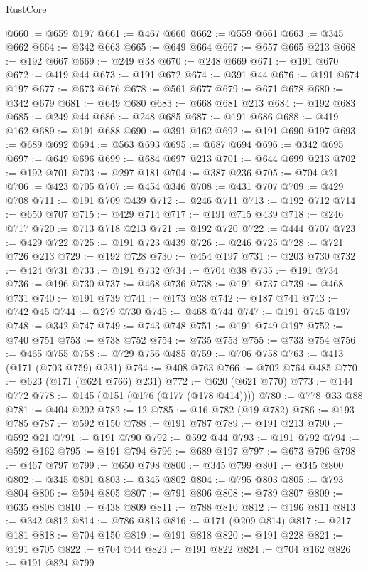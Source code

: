 \begin{lexlean}{RustCore}
\begin{coremodule}
@660 := @659 @197
@661 := @467 @660
@662 := @559 @661
@663 := @345 @662
@664 := @342 @663
@665 := @649 @664
@667 := @657 @665 @213
@668 := @192 @667
@669 := @249 @38
@670 := @248 @669
@671 := @191 @670
@672 := @419 @44
@673 := @191 @672
@674 := @391 @44
@676 := @191 @674 @197
@677 := @673 @676
@678 := @561 @677
@679 := @671 @678
@680 := @342 @679
@681 := @649 @680
@683 := @668 @681 @213
@684 := @192 @683
@685 := @249 @44
@686 := @248 @685
@687 := @191 @686
@688 := @419 @162
@689 := @191 @688
@690 := @391 @162
@692 := @191 @690 @197
@693 := @689 @692
@694 := @563 @693
@695 := @687 @694
@696 := @342 @695
@697 := @649 @696
@699 := @684 @697 @213
@701 := @644 @699 @213
@702 := @192 @701
@703 := @297 @181
@704 := @387 @236
@705 := @704 @21
@706 := @423 @705
@707 := @454 @346
@708 := @431 @707
@709 := @429 @708
@711 := @191 @709 @439
@712 := @246 @711
@713 := @192 @712
@714 := @650 @707
@715 := @429 @714
@717 := @191 @715 @439
@718 := @246 @717
@720 := @713 @718 @213
@721 := @192 @720
@722 := @444 @707
@723 := @429 @722
@725 := @191 @723 @439
@726 := @246 @725
@728 := @721 @726 @213
@729 := @192 @728
@730 := @454 @197
@731 := @203 @730
@732 := @424 @731
@733 := @191 @732
@734 := @704 @38
@735 := @191 @734
@736 := @196 @730
@737 := @468 @736
@738 := @191 @737
@739 := @468 @731
@740 := @191 @739
@741 := @173 @38
@742 := @187 @741
@743 := @742 @45
@744 := @279 @730
@745 := @468 @744
@747 := @191 @745 @197
@748 := @342 @747
@749 := @743 @748
@751 := @191 @749 @197
@752 := @740 @751
@753 := @738 @752
@754 := @735 @753
@755 := @733 @754
@756 := @465 @755
@758 := @729 @756 @485
@759 := @706 @758
@763 := @413 (@171 (@703 @759) @231)
@764 := @408 @763
@766 := @702 @764 @485
@770 := @623 (@171 (@624 @766) @231)
@772 := @620 (@621 @770)
@773 := @144 @772
@778 := @145 (@151 (@176 (@177 (@178 @414))))
@780 := @778 @33 @88
@781 := @404 @202
@782 := 12
@785 := @16 @782 (@19 @782)
@786 := @193 @785
@787 := @592 @150
@788 := @191 @787
@789 := @191 @213
@790 := @592 @21
@791 := @191 @790
@792 := @592 @44
@793 := @191 @792
@794 := @592 @162
@795 := @191 @794
@796 := @689 @197
@797 := @673 @796
@798 := @467 @797
@799 := @650 @798
@800 := @345 @799
@801 := @345 @800
@802 := @345 @801
@803 := @345 @802
@804 := @795 @803
@805 := @793 @804
@806 := @594 @805
@807 := @791 @806
@808 := @789 @807
@809 := @635 @808
@810 := @438 @809
@811 := @788 @810
@812 := @196 @811
@813 := @342 @812
@814 := @786 @813
@816 := @171 (@209 @814)
@817 := @217 @181
@818 := @704 @150
@819 := @191 @818
@820 := @191 @228
@821 := @191 @705
@822 := @704 @44
@823 := @191 @822
@824 := @704 @162
@826 := @191 @824 @799

\end{coremodule}
\end{lexlean}
